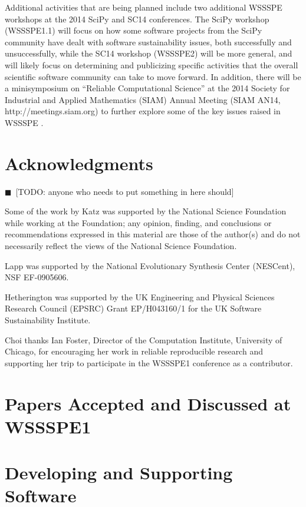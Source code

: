 \documentclass[11pt, oneside]{amsart}
\newcommand{\todo}[1]{{\color{blue}$\blacksquare$~\textsf{[TODO: #1]}}}
\begin{document}
Additional activities that are being planned include
two additional WSSSPE workshops at the 2014 SciPy and SC14 conferences.
The SciPy workshop (WSSSPE1.1) will focus on how some software projects
from the SciPy community have dealt with software sustainability issues, both
successfully and unsuccessfully, while the SC14 workshop (WSSSPE2) will
be more general, and will likely focus on determining and publicizing specific
activities that the overall scientific software community can take to move forward.
In addition, there will be a minisymposium on ``Reliable Computational Science''
at the 2014 Society for Industrial and Applied Mathematics (SIAM)
Annual Meeting (SIAM AN14, http://meetings.siam.org)
to further explore some of the key issues raised in
WSSSPE .



\section*{Acknowledgments}

\todo{anyone who needs to put something in here should}

Some of the work by Katz was
supported by the National Science Foundation while working at the
Foundation; any opinion, finding, and conclusions or recommendations
expressed in this material are those of the author(s) and do not
necessarily reflect the views of the National Science Foundation. 

Lapp was supported by the National Evolutionary Synthesis Center (NESCent), 
NSF EF-0905606.

Hetherington was supported by the UK Engineering and 
Physical Sciences Research Council (EPSRC) Grant EP/H043160/1 for the 
UK Software Sustainability Institute.


Choi thanks Ian Foster, Director of the Computation Institute, University of Chicago,
for encouraging her work in reliable reproducible research and 
supporting her trip to participate in the WSSSPE1 conference as a contributor.


\appendix
\section{Papers Accepted and Discussed at WSSSPE1} \label{sec:papers}

\section*{Developing and Supporting Software}
\end{document}
